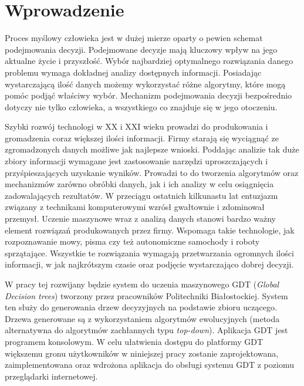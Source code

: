 \chapter*{Wprowadzenie}
Proces myślowy człowieka jest w dużej mierze oparty o pewien schemat podejmowania decyzji. Podejmowane decyzje mają kluczowy wpływ na jego aktualne życie i przyszłość. Wybór najbardziej optymalnego rozwiązania danego problemu wymaga dokładnej analizy dostępnych informacji. Posiadając wystarczającą ilość danych możemy wykorzystać różne algorytmy, które mogą pomóc podjąć właściwy wybór. Mechanizm podejmowania decyzji bezpośrednio dotyczy nie tylko człowieka, a wszystkiego co znajduje się w jego otoczeniu. 

Szybki rozwój technologi w XX i XXI wieku prowadzi do produkowania i gromadzenia coraz większej ilości informacji. Firmy starają się wyciągnąć ze zgromadzonych danych możliwe jak najlepsze wnioski. Poddając analizie tak duże zbiory informacji wymagane jest zastosowanie narzędzi uproszczających i przyśpieszających uzyskanie wyników. Prowadzi to do tworzenia algorytmów oraz mechanizmów zarówno obróbki danych, jak i ich analizy w celu osiągnięcia zadowalających rezultatów. W przeciągu ostatnich kilkunastu lat entuzjazm związany z technikami komputerowymi wzrósł gwałtownie i zdominował przemysł. Uczenie maszynowe wraz z analizą danych stanowi bardzo ważny element rozwiązań produkowanych przez firmy. Wspomaga takie technologie, jak rozpoznawanie mowy, pisma czy też autonomiczne samochody i roboty sprzątające. Wszystkie te rozwiązania wymagają przetwarzania ogromnych ilości informacji, w jak najkrótszym czasie oraz podjęcie wystarczająco dobrej decyzji.

W pracy tej rozwijany będzie system do uczenia maszynowego GDT (\textit{Global Decision trees})\cite{sgdt_1} tworzony przez pracowników Politechniki Białostockiej. System ten służy do generowania drzew decyzyjnych na podstawie zbioru uczącego. Drzewa generowane są z wykorzystaniem algorytmów ewolucyjnych (metoda alternatywna do algorytmów zachłannych typu \textit{top-down}). Aplikacja GDT jest programem konsolowym. W celu ułatwienia dostępu do platformy GDT większemu gronu użytkowników w niniejszej pracy zostanie zaprojektowana, zaimplementowana oraz wdrożona aplikacja do obsługi systemu GDT z poziomu przeglądarki internetowej.  


